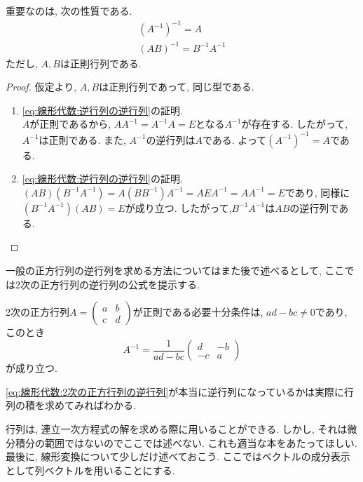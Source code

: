 \documentclass[a4j,dvipdfmx]{jsarticle}
\numberwithin{equation}{section}
\begin{document}
            重要なのは, 次の性質である.
            \begin{align}
                (A^{-1})^{-1}=A \label{eq:線形代数:逆行列の逆行列}\\
                (AB)^{-1}=B^{-1}A^{-1} \label{eq:線形代数:積の逆行列}
            \end{align}
            ただし, $A,B$は正則行列である.
            \begin{proof} 仮定より, $A,B$は正則行列であって, 同じ型である.
                \begin{enumerate}
                    \item \eqref{eq:線形代数:逆行列の逆行列}の証明.\\
                    $A$が正則であるから, $AA^{-1}=A^{-1}A=E$となる$A^{-1}$が存在する. したがって, $A^{-1}$は正則である. また, $A^{-1}$の逆行列は$A$である.
                    よって$(A^{-1})^{-1}=A$である.
                    \item \eqref{eq:線形代数:逆行列の逆行列}の証明.\\
                    $(AB)(B^{-1}A^{-1})=A(BB^{-1})A^{-1}=AEA^{-1}=AA^{-1}=E$であり, 同様に$(B^{-1}A^{-1})(AB)=E$が成り立つ.
                    したがって,$B^{-1}A^{-1}$は$AB$の逆行列である.
                \end{enumerate}
            \end{proof}

            一般の正方行列の逆行列を求める方法についてはまた後で述べるとして, ここでは2次の正方行列の逆行列の公式を提示する.
            \begin{screen}
            2次の正方行列$\displaystyle A=\begin{pmatrix}a & b \\ c & d\end{pmatrix}$が正則である必要十分条件は, $ad-bc\neq 0$であり, このとき
            \begin{equation}
                A^{-1}=\frac{1}{ad-bc}\begin{pmatrix}d & -b \\ -c & a\end{pmatrix} \label{eq:線形代数:2次の正方行列の逆行列}
            \end{equation}
            が成り立つ.
            \end{screen}
            \eqref{eq:線形代数:2次の正方行列の逆行列}が本当に逆行列になっているかは実際に行列の積を求めてみればわかる.

            行列は, 連立一次方程式の解を求める際に用いることができる. しかし, それは微分積分の範囲ではないのでここでは述べない. これも適当な本をあたってほしい.
            \clearpage
            最後に, 線形変換について少しだけ述べておこう. ここではベクトルの成分表示として列ベクトルを用いることにする.
\end{document}

